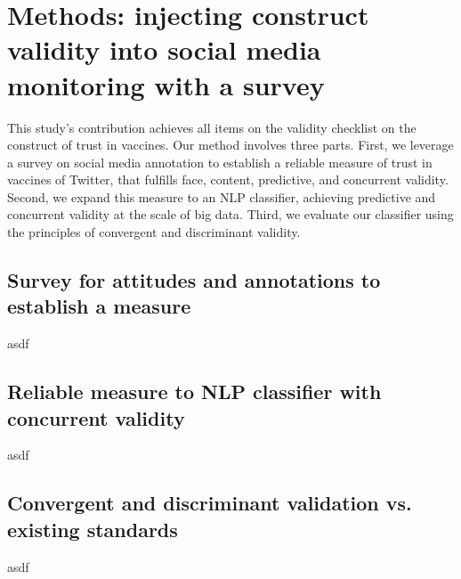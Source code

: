 \chapter{Methods: injecting construct validity into social media monitoring with a survey}\label{chap:methods}

This study’s contribution achieves all items on the validity checklist on the construct of trust in vaccines. Our method involves three parts. First, we leverage a survey on social media annotation to establish a reliable measure of trust in vaccines of Twitter, that fulfills face, content, predictive, and concurrent validity. Second, we expand this measure to an NLP classifier, achieving predictive and concurrent validity at the scale of big data. Third, we evaluate our classifier using the principles of convergent and discriminant validity.

\section{Survey for attitudes and annotations to establish a measure}
asdf
\section{Reliable measure to NLP classifier with concurrent validity}
asdf
\section{Convergent and discriminant validation vs. existing standards}
asdf